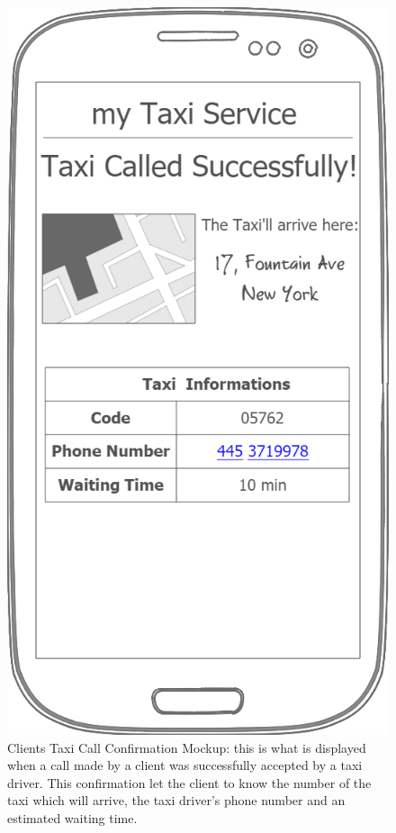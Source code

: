 \documentclass[a4paper]{article}
\begin{document}
\begin{figure}[H]
\includegraphics[width=\mockupWidth]{Mockup-ClientsTaxiCallConfirmation}
\centering
\caption[Clients Taxi Call Confirmation Mockup]{Clients Taxi Call Confirmation Mockup: \newline this is what is displayed when a call made by a client was successfully accepted by a taxi driver. This confirmation let the client to know the number of the taxi which will arrive, the taxi driver's phone number and an estimated waiting time.}
\label{fig:mockupclienttaxicallconfirmation}
\end{figure}
\end{document}
